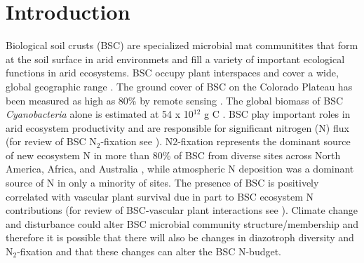 \section{Introduction}
Biological soil crusts (BSC) are specialized microbial mat communitites that form at the soil surface in arid environmets and fill a variety of important ecological functions in arid ecosystems. BSC occupy plant interspaces and cover a
wide, global geographic range \citep{garcia2003estimates}. The ground cover of
BSC on the Colorado Plateau has been measured as high as 80\% by remote sensing
\citep{karnieli2001}. The global biomass of BSC \textit{Cyanobacteria} alone is
estimated at 54 x 10$^{12}$ g C \citep{garcia2003estimates}. BSC play important
roles in arid ecosystem productivity and are responsible for significant
nitrogen (N) flux (for review of BSC N$_{2}$-fixation see \citet{belnap2003}).
N2-fixation represents the dominant source of new ecosystem N in more than 80\%
of BSC from diverse sites across North America, Africa, and Australia 
\citep{Evans_1999}, while atmospheric N deposition was a dominant source of N
in only a minority of sites. The presence of BSC is positively correlated with
vascular plant survival due in part to BSC ecosystem N contributions (for
review of BSC-vascular plant interactions see \citet{BelnapVascular}). Climate
change and disturbance could alter BSC microbial community structure/membership
and therefore it is possible that there will also be changes in diazotroph diversity
and N$_{2}$-fixation and that these changes can alter the BSC N-budget.

